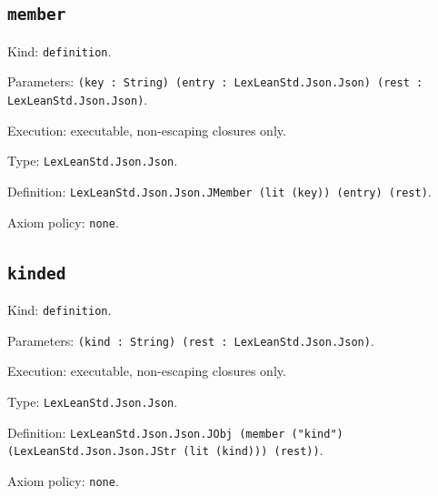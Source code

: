\documentclass[11pt]{article}
\begin{document}
\subsection*{\texttt{member}}
\noindent Kind: \texttt{definition}.\par
\noindent Parameters: \texttt{(key : String) (entry : LexLeanStd.Json.Json) (rest : LexLeanStd.Json.Json)}.\par
\noindent Execution: executable, non-escaping closures only.\par
\noindent Type: \texttt{LexLeanStd.Json.Json}.\par
\noindent Definition: \texttt{LexLeanStd.Json.Json.JMember (lit (key)) (entry) (rest)}.\par
\noindent Axiom policy: \texttt{none}.\par
\subsection*{\texttt{kinded}}
\noindent Kind: \texttt{definition}.\par
\noindent Parameters: \texttt{(kind : String) (rest : LexLeanStd.Json.Json)}.\par
\noindent Execution: executable, non-escaping closures only.\par
\noindent Type: \texttt{LexLeanStd.Json.Json}.\par
\noindent Definition: \texttt{LexLeanStd.Json.Json.JObj (member ("kind") (LexLeanStd.Json.Json.JStr (lit (kind))) (rest))}.\par
\noindent Axiom policy: \texttt{none}.\par
\end{document}
